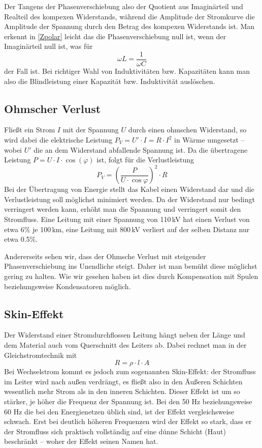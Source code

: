 \documentclass[10pt,a4paper]{article}
\begin{document}
Der Tangens der Phasenverschiebung also der Quotient aus Imaginärteil und Realteil des kompexen Widerstands, während die Amplitude der Stromkurve die Amplitude der Spannung durch den Betrag des kompexen Widerstands ist.
Man erkennt in \ref{Zpolar} leicht das die Phasenverschiebung null ist, wenn der Imaginärteil null ist, was für 
\begin{equation}
\omega L = \frac{1}{\omega C}
\end{equation}
der Fall ist. Bei richtiger Wahl von Induktivitäten bzw. Kapazitäten kann man also die Blindleistung einer Kapazität bzw. Induktivität auslöschen.

\subsection{Ohmscher Verlust}
Fließt ein Strom $I$ mit der Spannung $U$ durch einen ohmschen Widerstand, so wird dabei die elektrische Leistung
$P_V = U' \cdot I = R \cdot I^2$
in Wärme umgesetzt -- wobei $U'$ die an dem Widerstand abfallende Spannung ist.
Da die übertragene Leistung $P=U \cdot I \cdot \cos(\varphi)$ ist, folgt für die Verlustleistung
\[P_V = \left(\frac{P}{U \cdot \cos\varphi}\right)^2\cdot R\]
Bei der Übertragung von Energie stellt das Kabel einen Widerstand dar und die Verlustleistung soll möglichst minimiert werden. Da der Widerstand nur bedingt verringert werden kann, erhöht man die Spannung und verringert somit den Stromfluss. Eine Leitung mit einer Spannung von 110\,kV hat einen Verlust von etwa 6\% je 100\,km, eine Leitung mit 800\,kV verliert auf der selben Distanz nur etwa 0.5\%.

Andererseits sehen wir, dass der Ohmsche Verlust mit steigender Phasenverschiebung ins Unendliche steigt. Daher ist man bemüht diese möglichst gering zu halten. Wie wir gesehen haben ist dies durch Kompensation mit Spulen beziehungsweise Kondensatoren möglich.

\subsection{Skin-Effekt}
Der Widerstand einer Stromdurchflossen Leitung hängt neben der Länge und dem Material auch vom Querschnitt des Leiters ab. Dabei rechnet man in der Gleichstromtechnik mit
\begin{equation}
R = \rho \cdot l \cdot A
\end{equation}
Bei Wechselstrom kommt es jedoch zum sogenannten Skin-Effekt: der Stromfluss im Leiter wird nach außen verdrängt, es fließt also in den Äußeren Schichten wesentlich mehr Strom als in den inneren Schichten. Dieser Effekt ist um so stärker, je höher die Frequenz der Spannung ist. Bei den 50 Hz beziehungsweise 60 Hz die bei den Energienetzen üblich sind, ist der Effekt vergleichsweise schwach. Erst bei deutlich höheren Frequenzen wird der Effekt so stark, dass er der Stromfluss sich praktisch vollständig auf eine dünne Schicht (Haut) beschränkt -- woher der Effekt seinen Namen hat. 
\end{document}
